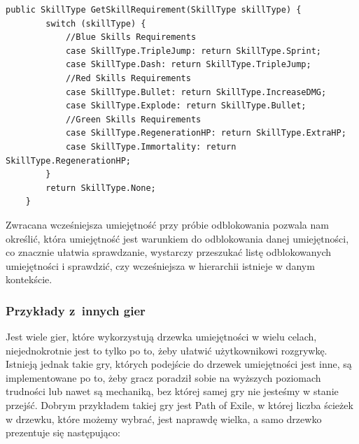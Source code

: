 \documentclass[oneside,polski,logo]{amuthesis}
\begin{document}
\newpage
\begin{lstlisting}[breaklines=true,
language={[Sharp]C},
rulecolor=\color{blue!80!black},
caption={Fragment klasy \texttt{PlayerSkills.cs}}
]    
    public SkillType GetSkillRequirement(SkillType skillType) {
        switch (skillType) {
            //Blue Skills Requirements
            case SkillType.TripleJump: return SkillType.Sprint;
            case SkillType.Dash: return SkillType.TripleJump;
            //Red Skills Requirements
            case SkillType.Bullet: return SkillType.IncreaseDMG;
            case SkillType.Explode: return SkillType.Bullet;
            //Green Skills Requirements
            case SkillType.RegenerationHP: return SkillType.ExtraHP;
            case SkillType.Immortality: return SkillType.RegenerationHP;
        }
        return SkillType.None;
    }
\end{lstlisting}

Zwracana wcześniejsza umiejętność przy próbie odblokowania pozwala nam określić, która umiejętność jest warunkiem do odblokowania danej umiejętności, co znacznie ułatwia sprawdzanie, wystarczy przeszukać listę odblokowanych umiejętności i sprawdzić, czy wcześniejsza w hierarchii istnieje w danym kontekście.

\subsubsection{Przykłady z~innych gier}
Jest wiele gier, które wykorzystują drzewka umiejętności w wielu celach, niejednokrotnie jest to tylko po to, żeby ułatwić użytkownikowi rozgrywkę. Istnieją jednak takie gry, których podejście do drzewek umiejętności jest inne, są implementowane po to, żeby gracz poradził sobie na wyższych poziomach trudności lub nawet są mechaniką, bez której samej gry nie jesteśmy w stanie przejść. Dobrym przykładem takiej gry jest Path of Exile, w której liczba ścieżek w drzewku, które możemy wybrać, jest naprawdę wielka, a samo drzewko prezentuje się następująco:
\end{document}

